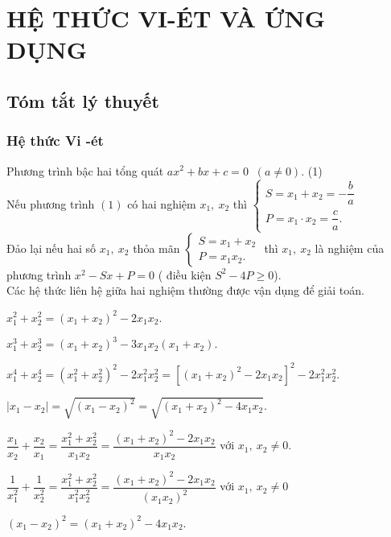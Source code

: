 \section{HỆ THỨC VI-ÉT VÀ ỨNG DỤNG}

\subsection{Tóm tắt lý thuyết}
\subsubsection{Hệ thức Vi -ét }
Phương trình bậc hai tổng quát $ax^2 + bx + c=0$ $\ (a\ne 0)$. \hfill(1)\\
Nếu phương trình $(1) $ có hai nghiệm $x_1,\ x_2$ thì $\begin{cases} S= x_1+ x_2 = -\dfrac{b}{a}\\ P= x_1\cdot x_2= \dfrac{c}{a}. \end{cases}$\\
Đảo lại nếu hai số $x_1,\ x_2$ thỏa mãn $\begin{cases} S= x_1+x_2\\ P=x_1x_2. \end{cases}$ thì $x_1,\ x_2$ là nghiệm của phương trình $x^2 - Sx + P =0$ ( điều kiện $S^2-4P\ge0 $).\\
Các hệ thức liên hệ giữa hai nghiệm thường được vận dụng để giải toán.
\begin{listEX}
	\item $x_1^2 + x_2^2 = (x_1+x_2)^2 -2x_1x_2.$
	\item $x_1^3 + x_2^3 =(x_1+x_2)^3 -3x_1x_2(x_1+x_2).$
	\item $x_1^4 +x_2^4 = (x_1^2+x_2^2)^2 -2x_1^2x_2^2 =\left[(x_1+x_2)^2 -2x_1x_2\right]^2 -2x_1^2x_2^2.$
	\item $|x_1-x_2| = \sqrt{(x_1-x_2)^2} = \sqrt{(x_1+x_2)^2 -4x_1x_2}.$
	\item $\dfrac{x_1}{x_2} + \dfrac{x_2}{x_1} = \dfrac{x_1^2+x_2^2}{x_1x_2} = \dfrac{(x_1+x_2)^2 -2x_1x_2}{x_1x_2}$ với $x_1,\ x_2 \ne 0$.
	\item $\dfrac{1}{x_1^2 } +\dfrac{1}{x_2^2} = \dfrac{x_1^2+x_2^2}{x_1^2x_2^2} = \dfrac{(x_1+x_2)^2-2x_1x_2}{(x_1x_2)^2}$ với $x_1,\ x_2 \ne 0$
	\item $(x_1-x_2)^2 = (x_1+x_2)^2 -4x_1x_2.$
\end{listEX}

